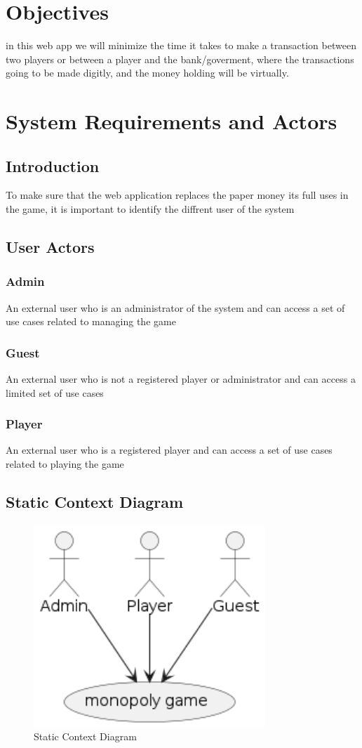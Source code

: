 \documentclass{article}
\begin{document}
\section{Objectives}\label{sec:obj}
in this web app we will minimize the time it takes to make a transaction between two players or between a player and the bank/goverment, where the transactions going to be made digitly, and the money holding will be virtually.

\section {System Requirements and Actors}
\subsection {Introduction}
To make sure that the web application replaces the paper money its full uses in the game, it is important to identify the diffrent user of the system

\subsection {User Actors}
\subsubsection {Admin}
An external user who is an administrator of the system and can access a set of use cases related to managing the game
\subsubsection {Guest}
An external user who is not a registered player or administrator and can access a limited set of use cases
\subsubsection {Player}
An external user who is a registered player and can access a set of use cases related to playing the game
\subsection{Static Context Diagram}
\begin{figure}[H]
	\centering
	\includegraphics[height=3in]{../thesis_tex/assets/diagrams/SCD.png}
	\caption{Static Context Diagram}
\end{figure}
\end{document}
